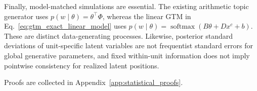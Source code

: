 Finally, model-matched simulations are essential.  The existing arithmetic
topic generator uses $p(w\mid\theta)=\theta^\top\Phi$, whereas the linear GTM
in Eq.~\eqref{eq:gtm_exact_linear_model} uses
$p(w\mid\theta)=\operatorname{softmax}(B\theta+Dx^c+b)$.  These are distinct
data-generating processes.  Likewise, posterior standard deviations of
unit-specific latent variables are not frequentist standard errors for global
generative parameters, and fixed within-unit information does not imply
pointwise consistency for realized latent positions.

Proofs are collected in Appendix~\ref{app:statistical_proofs}.
